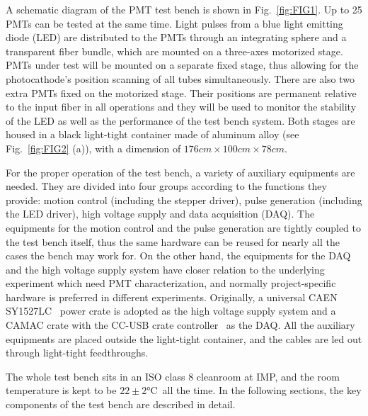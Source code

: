 \documentclass{nst}
\begin{document}
A schematic diagram of the PMT test bench is shown in Fig.~\ref{fig:FIG1}.
Up to 25 PMTs can be tested at the same time.
Light pulses from a blue light emitting diode (LED) are distributed to the PMTs through an integrating sphere and a transparent fiber bundle, which are mounted on a three-axes motorized stage.
PMTs under test will be mounted on a separate fixed stage, thus allowing for the photocathode's position scanning of all tubes simultaneously.
There are also two extra PMTs fixed on the motorized stage.
Their positions are permanent relative to the input fiber in all operations and they will be used to monitor the stability of the LED as well as the performance of the test bench system.
Both stages are housed in a black light-tight container made of aluminum alloy (see Fig.~\ref{fig:FIG2} (a)), with a dimension of $176cm\times100cm\times78cm$.

For the proper operation of the test bench, a variety of auxiliary equipments are needed. 
They are divided into four groups according to the functions they provide: motion control (including the stepper driver), pulse generation (including the LED driver), high voltage supply and data acquisition (DAQ).
The equipments for the motion control and the pulse generation are tightly coupled to the test bench itself, thus the same hardware can be reused for nearly all the cases the bench may work for.
On the other hand, the equipments for the DAQ and the high voltage supply system have closer relation to the underlying experiment which need PMT characterization, and normally project-specific hardware is preferred in different experiments.
Originally, a universal CAEN SY1527LC~\cite{sy1527lc} power crate is adopted as the high voltage supply system and a CAMAC crate with the CC-USB crate controller~\cite{cc_usb} as the DAQ.
All the auxiliary equipments are placed outside the light-tight container, and the cables are led out through light-tight feedthroughs.

The whole test bench sits in an ISO class 8 cleanroom at IMP, and the room temperature is kept to be $22\pm2$\si{\celsius}~all the time. 
In the following sections, the key components of the test bench are described in detail.
\end{document}
